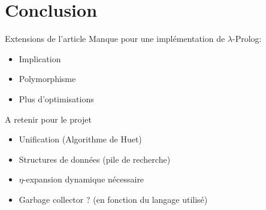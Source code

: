 \documentclass[aspectratio=169]{beamer}
\begin{document}
\section{Conclusion}

\begin{frame}{Extensions de l'article}
  Manque pour une implémentation de $\lambda$-Prolog:
  \begin{itemize}
    \item Implication
    \item Polymorphisme
    \item Plus d'optimisations
  \end{itemize}
\end{frame}

\begin{frame}{A retenir pour le projet}
  \begin{itemize}
    \item Unification (Algorithme de Huet)
    \item Structures de données (pile de recherche)
    \item $\eta$-expansion dynamique nécessaire
    \item Garbage collector ? (en fonction du langage utilisé)
  \end{itemize}
\end{frame}
\end{document}
